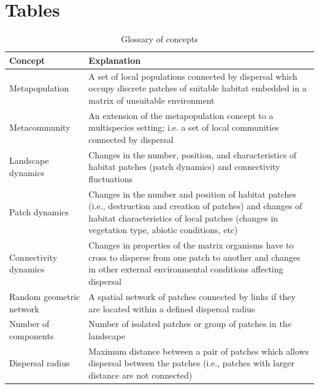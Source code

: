 \documentclass[12pt]{article}
\begin{document}
\section*{Tables}

\begin{table}[H]
\begin{tabular}{  p{6cm}  |  p{10cm} }
  \hline
  \textbf{Concept} & \textbf{Explanation}\\  \hline
  Metapopulation & A set of local populations connected by dispersal which occupy discrete patches of suitable habitat embedded in a matrix of unsuitable environment \\ \hline
  Metacommunity &  An extension of the metapopulation concept to a multispecies setting; 
  i.e. a set of local communities connected by dispersal \\ \hline  
  Landscape dynamics & Changes in the number, position, and characteristics of habitat patches (patch dynamics) and connectivity fluctuations \\ \hline
  Patch dynamics & Changes in the number and position of habitat patches (i.e., destruction and creation of patches) and changes of habitat 
  characteristics of local patches (changes in vegetation type, abiotic conditions, etc) \\ \hline
  Connectivity dynamics & Changes in properties of the matrix organisms have to cross 
to disperse from one patch to another and changes in other external environmental conditions affecting dispersal \\ \hline
  Random geometric network  & A spatial network of patches connected by links if they are located within a defined dispersal radius \\ \hline
 Number of components & Number of isolated patches or group of patches in the landscape \\ \hline
  Dispersal radius  & Maximum distance between a pair of patches which allows dispersal between the patches (i.e., patches with larger distance are not connected) \\ \hline
\end{tabular}
\label{table1}
\caption{Glossary of concepts}
\end{table}
\end{document}
